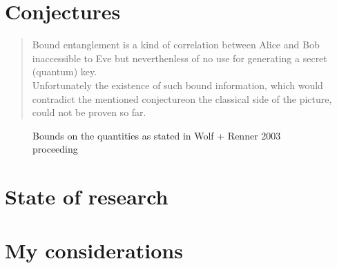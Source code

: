 	\section{Conjectures}
			\begin{quotation}
			Bound entanglement is a kind of correlation between Alice and Bob inaccessible to Eve but neverthenless of no use for generating a secret (quantum) key.\\
			Unfortunately the existence of such bound information, which would contradict the mentioned conjecture\footnotemark on the classical side of the picture, could not be proven so far.
		\end{quotation}
		
	\begin{figure}
		\centering
		
		\caption{Bounds on the quantities as stated in Wolf + Renner 2003 proceeding}
	\end{figure}
	\section{State of research}
	\section{My considerations}
